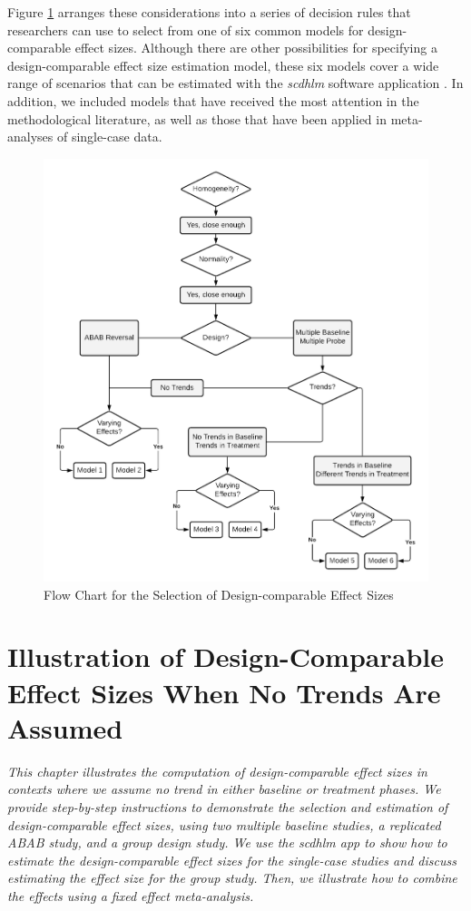 \documentclass[
]{book}
\begin{document}
Figure \ref{fig:DC-ES-flow-chart} arranges these considerations into a series of decision rules that researchers can use to select from one of six common models for design-comparable effect sizes. Although there are other possibilities for specifying a design-comparable effect size estimation model, these six models cover a wide range of scenarios that can be estimated with the \emph{scdhlm} software application \citep{pustejovsky2021scdhlm}. In addition, we included models that have received the most attention in the methodological literature, as well as those that have been applied in meta-analyses of single-case data.

\begin{figure}
\includegraphics[width=0.75\linewidth]{images/DC-ES-flow-chart} \caption{Flow Chart for the Selection of Design-comparable Effect Sizes}\label{fig:DC-ES-flow-chart}
\end{figure}

\hypertarget{illustrate-D-CES}{%
\chapter{Illustration of Design-Comparable Effect Sizes When No Trends Are Assumed}\label{illustrate-D-CES}}


\emph{This chapter illustrates the computation of design-comparable effect sizes in contexts where we assume no trend in either baseline or treatment phases. We provide step-by-step instructions to demonstrate the selection and estimation of design-comparable effect sizes, using two multiple baseline studies, a replicated ABAB study, and a group design study. We use the \emph{scdhlm} app to show how to estimate the design-comparable effect sizes for the single-case studies and discuss estimating the effect size for the group study. Then, we illustrate how to combine the effects using a fixed effect meta-analysis.}
\end{document}
